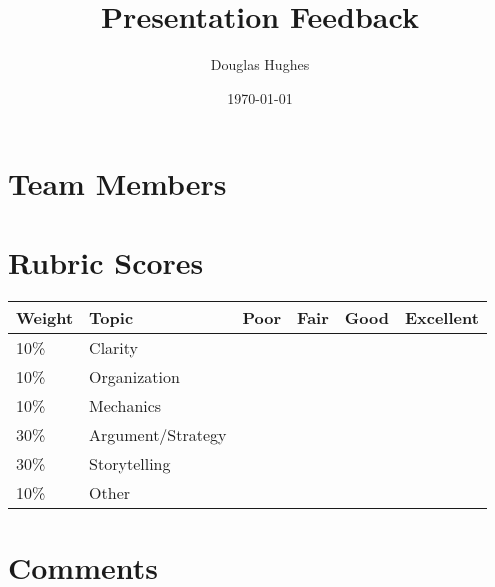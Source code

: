 \documentclass{article}
\author{Douglas Hughes}
\date{\today}
\title{Presentation Feedback}
\begin{document}
\maketitle

\section{Team Members}
\label{sec-1}

\section{Rubric Scores}
\label{sec-2}

\begin{center}
\begin{tabular}{llllll}
\textbf{Weight} & \textbf{Topic} & \textbf{Poor} & \textbf{Fair} & \textbf{Good} & \textbf{Excellent}\\
\hline
10\% & Clarity &  &  &  & \\
10\% & Organization &  &  &  & \\
10\% & Mechanics &  &  &  & \\
30\% & Argument/Strategy &  &  &  & \\
30\% & Storytelling &  &  &  & \\
10\% & Other &  &  &  & \\
\end{tabular}
\end{center}

\section{Comments}
\label{sec-3}
\end{document}
